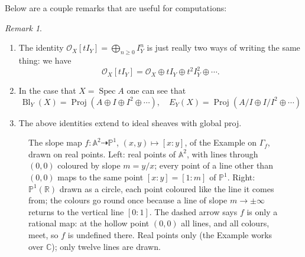 \documentclass[12pt]{article}
\numberwithin{equation}{section}
\theoremstyle{definition}
\theoremstyle{remark}
\newtheorem{remark}[theorem]{Remark}
\newcommand{\RR}{\mathbb{R}}
\newcommand{\CC}{\mathbb{C}}
\newcommand{\Ocal}{\mathcal{O}}
\newcommand{\PP}{\mathbb{P}}
\renewcommand{\AA}{\mathbb{A}}
\newcommand{\Spec}{\operatorname{Spec}}
\newcommand{\Proj}{\operatorname{Proj}}
\newcommand{\Bl}{\operatorname{Bl}}
\begin{document}
Below are a couple remarks that are useful for computations:
\begin{remark}
\begin{enumerate}
\item The identity $\Ocal_X[tI_Y]=\bigoplus_{n\geq 0} I_Y^{n}$ is just really two ways of writing the same thing: we have 
$$\Ocal_X[tI_Y] = \Ocal_X \oplus tI_Y \oplus t^2 I_Y^2\oplus \cdots.$$
\item In the case that $X=\Spec A$ one can see that 
 $$ \Bl_Y(X) = \Proj( A\oplus I \oplus I^2 \oplus \cdots ), \quad  E_Y(X) = \Proj( A/I \oplus I/I^2 \oplus \cdots ) $$
\item The above identities extend to ideal sheaves with global proj.
 \end{enumerate}
\end{remark}

\begin{figure}[H]
\centering

\caption{The slope map $f\colon\AA^2\dashrightarrow\PP^1$, $(x,y)\mapsto[x:y]$, of the Example on $\Gamma_f$, drawn on real points. Left: real points of $\AA^2$, with lines through $(0,0)$ coloured by slope $m=y/x$; every point of a line other than $(0,0)$ maps to the same point $[x:y]=[1:m]$ of $\PP^1$. Right: $\PP^1(\RR)$ drawn as a circle, each point coloured like the line it comes from; the colours go round once because a line of slope $m\to\pm\infty$ returns to the vertical line $[0:1]$. The dashed arrow says $f$ is only a rational map: at the hollow point $(0,0)$ all lines, and all colours, meet, so $f$ is undefined there. Real points only (the Example works over $\CC$); only twelve lines are drawn.}\label{fig:slope-map}
\end{figure}
\end{document}
